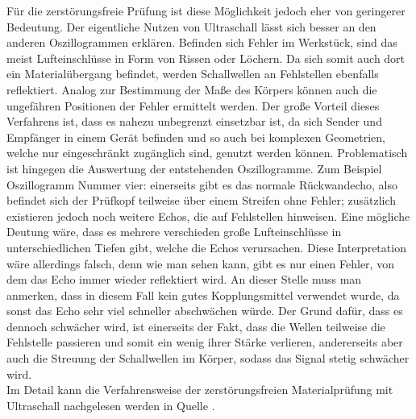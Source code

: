 \documentclass[a4paper, 10pt]{scrartcl}
\begin{document}
Für die zerstörungsfreie Prüfung ist diese Möglichkeit jedoch eher von geringerer Bedeutung. Der eigentliche Nutzen von Ultraschall lässt sich besser an den anderen Oszillogrammen erklären. Befinden sich Fehler im Werkstück, sind das meist Lufteinschlüsse in Form von Rissen oder Löchern. Da sich somit auch dort ein Materialübergang befindet, werden Schallwellen an Fehlstellen ebenfalls reflektiert. Analog zur Bestimmung der Maße des Körpers können auch die ungefähren Positionen der Fehler ermittelt werden. Der große Vorteil dieses Verfahrens ist, dass es nahezu unbegrenzt einsetzbar ist, da sich Sender und Empfänger in einem Gerät befinden und so auch bei komplexen Geometrien, welche nur eingeschränkt zugänglich sind, genutzt werden können. Problematisch ist hingegen die Auswertung der entstehenden Oszillogramme. Zum Beispiel Oszillogramm Nummer vier: einerseits gibt es das normale Rückwandecho, also befindet sich der Prüfkopf teilweise über einem Streifen ohne Fehler; zusätzlich existieren jedoch noch weitere Echos, die auf Fehlstellen hinweisen. Eine mögliche Deutung wäre, dass es mehrere verschieden große Lufteinschlüsse in unterschiedlichen Tiefen gibt, welche die Echos verursachen. Diese Interpretation wäre allerdings falsch, denn wie man sehen kann, gibt es nur einen Fehler, von dem das Echo immer wieder reflektiert wird. An dieser Stelle muss man anmerken, dass in diesem Fall kein gutes Kopplungsmittel verwendet wurde, da sonst das Echo sehr viel schneller abschwächen würde. Der Grund dafür, dass es dennoch schwächer wird, ist einerseits der Fakt, dass die Wellen teilweise die Fehlstelle passieren und somit ein wenig ihrer Stärke verlieren, andererseits aber auch die Streuung der Schallwellen im Körper, sodass das Signal stetig schwächer wird.\\
Im Detail kann die Verfahrensweise der zerstörungsfreien Materialprüfung mit Ultraschall nachgelesen werden in Quelle \cite{karldeutsch}.

\printbibliography
\end{document}
